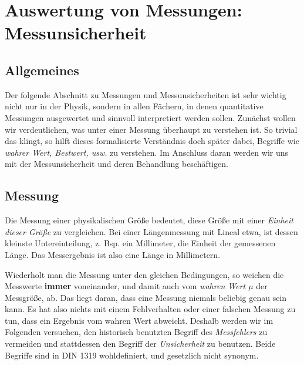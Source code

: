 \chapter{Auswertung von Messungen: Messunsicherheit} \label{v:fehlerJW}

\section{Allgemeines}

Der folgende Abschnitt zu Messungen und Messunsicherheiten ist sehr wichtig nicht nur in der Physik, sondern in allen Fächern, in denen quantitative Messungen ausgewertet und sinnvoll interpretiert werden sollen. Zunächst wollen wir verdeutlichen, was unter einer Messung überhaupt zu verstehen ist. So trivial das klingt, so hilft dieses formalisierte Verständnis doch später dabei, Begriffe wie \textit{wahrer Wert, Bestwert, usw.} zu verstehen. Im Anschluss daran werden wir uns mit der Messunsicherheit und deren Behandlung beschäftigen.


\section{Messung}

Die Messung einer physikalischen Größe bedeutet, diese Größe mit einer \textit{Einheit dieser Größe} zu vergleichen. Bei einer Längenmessung mit Lineal etwa, ist dessen kleinste Untereinteilung, z. Bsp. ein Millimeter, die Einheit der gemessenen Länge. Das Messergebnis ist also eine Länge in Millimetern.

Wiederholt man die Messung unter den gleichen Bedingungen, so weichen die Messwerte \textbf{immer} voneinander, und damit auch vom \textit{wahren Wert $\mu$} der Messgröße, ab. Das liegt daran, dass eine Messung niemals beliebig genau sein kann. Es hat also nichts mit einem Fehlverhalten oder einer falschen Messung zu tun, dass ein Ergebnis vom wahren Wert abweicht. Deshalb werden wir im Folgenden versuchen, den historisch benutzten Begriff des \textit{Messfehlers} zu vermeiden und stattdessen den Begriff der \textit{Unsicherheit} zu benutzen. Beide Begriffe sind in DIN 1319 wohldefiniert, und gesetzlich nicht synonym.

